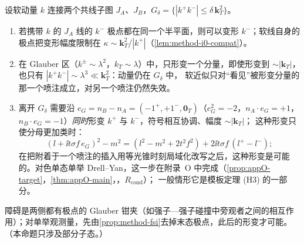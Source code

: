 \begin{proposition}\label{prop:method-glauber-deformation}
设软动量 $k$ 连接两个共线子图 $J_A$、$J_B$，$G_\delta=\{|k^+k^-|\le\delta\,\mathbf k_T^2\}$。
\begin{enumerate}[label=(\alph*),leftmargin=2em,itemsep=1pt,topsep=2pt]
\item 若携带 $k$ 的 $J_A$ 线的 $k^-$ 极点都在同一个半平面，则可以变形 $k^-$；软线自身的极点把变形幅度限制在 $\kappa\sim\mathbf k_T^2/|k^+|$（\cref{lem:method-i0-compat}）。
\item 在 Glauber 区（$k^\pm\sim\lambda^2$，$k_T\sim\lambda$）中，只形变一个分量，即使形变到 $\sim|\mathbf k_T|$，也只有 $|k^+k^-|\sim\lambda^3\ll\mathbf k_T^2$：动量仍在 $G_\delta$ 中，
  软近似只对“看见”被形变分量的那一个喷注成立，对另一个喷注仍然失效。
\item 离开 $G_\delta$ 需要沿 $e_G=n_B-n_A=(-1^+,+1^-,\mathbf 0_T)$（$e_G^2=-2$，$n_A\cdot e_G=+1$，$n_B\cdot e_G=-1$）\emph{同时}形变 $k^+$ 与 $k^-$，符号相互协调、幅度 $\sim|\mathbf k_T|$；
  这种形变只使分母更加类时：
  \begin{equation}\label{eq:method-eG}
  (l+\ii t\sigma f\,e_G)^2-m^2=(l^2-m^2+2t^2f^2)+2\ii t\sigma f\,(l^+-l^-) ;
  \end{equation}
  在把附着于一个喷注的插入用等光锥时刻局域化改写之后，这种形变是可能的。对色单态单举 Drell--Yan，这一步在附录~O 中完成（\cref{prop:appO-target}，\cref{thm:appO-main}，\tagR，$R_{\mathrm{cond}}$）；
  一般情形它是模板定理 (H3) 的一部分。
\end{enumerate}
障碍是两侧都有极点的 Glauber 钳夹（如强子—强子碰撞中旁观者之间的相互作用）；对单举观测量，先由\cref{prop:method-fsi}去掉末态极点，此后的形变才可能。（本命题只涉及部分子态。）
\end{proposition}


